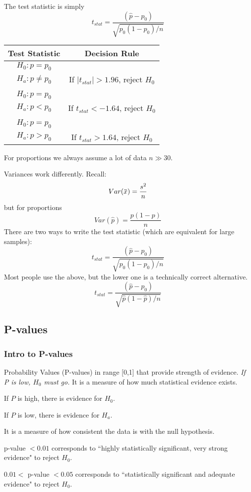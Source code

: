 \documentclass[11pt, oneside]{article}   	%
\newcommand{\overbar}[1]{\mkern 1.5mu\overline{\mkern-1.5mu#1\mkern-1.5mu}\mkern 1.5mu}
\begin{document}
The test statistic is simply
\[
t_{stat} = \frac{(\hat{p} - p_0)}{\sqrt{p_0(1-p_0)/n}}
\]

\begin{tabular}{ c  c }
Test Statistic & Decision Rule \\
\hline
$H_0 : p = p_0$ \\      $H_a : p \neq p_0$ & If $|t_{stat}| > 1.96$, reject $H_0$ \\
 & \\
$H_0 : p = p_0$  \\ $H_a : p < p_0$      & If $t_{stat} < -1.64$, reject $H_0$ \\
 & \\
$H_0 : p = p_0$ \\ $H_a : p > p_0$      & If $t_{stat} > 1.64$, reject $H_0$ \\
\end{tabular}

For proportions we always assume a lot of data $n \gg 30$.

Variances work differently. Recall:
\[
Var(\overbar{x}) = \frac {s^2} {n}
\]
but for proportions
\[
Var(\hat{p}) = \frac{p(1-p) } {n } 
\]
There are two ways to write the test statistic (which are equivalent for large samples):
\[
t_{stat} = \frac{(\hat{p} - p_0)}{\sqrt{p_0(1-p_0)/n}}
\]
Most people use the above, but the lower one is a technically correct alternative.
\[
t_{stat} = \frac{(\hat{p} - p_0)}{\sqrt{\hat{p}(1-\hat{p})/n}}
\]

\subsection{P-values}
\subsubsection{Intro to P-values}

Probability Values (P-values) in range [0,1] that provide strength of evidence. \textit{If P is low, $H_0$ must go.} It is a measure of how much statistical evidence exists. 

If $P$ is high, there is evidence for $H_0$.

If $P$ is low, there is evidence for $H_a$.

It is a measure of how consistent the data is with the null hypothesis. 

p-value $< 0.01$ corresponds to ``highly statistically significant, very strong evidence" to reject $H_0$.

$0.01 <$ p-value $< 0.05$ corresponds to ``statistically significant and adequate evidence" to reject $H_0$.
\end{document}
